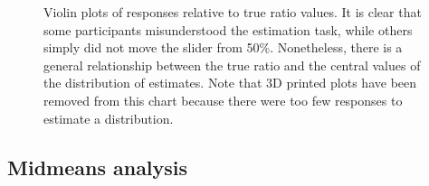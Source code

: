\documentclass[runningheads
]{llncs}
\begin{document}
\begin{figure}


\caption{\label{fig-violin-accuracy}Violin plots of responses relative
to true ratio values. It is clear that some participants misunderstood
the estimation task, while others simply did not move the slider from
50\%. Nonetheless, there is a general relationship between the true
ratio and the central values of the distribution of estimates. Note that
3D printed plots have been removed from this chart because there were
too few responses to estimate a distribution.}

\end{figure}%

\subsection{Midmeans analysis}\label{midmeans-analysis}
\end{document}
